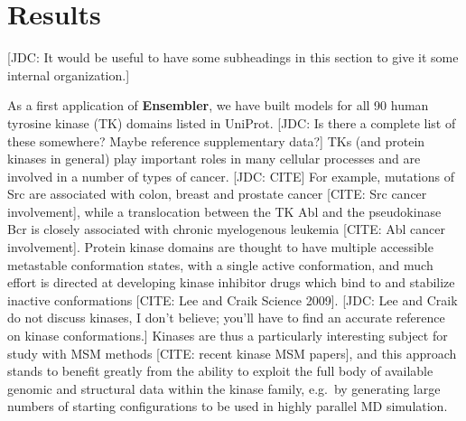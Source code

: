 \documentclass[aps,pre,twocolumn,nofootinbib,superscriptaddress,linenumbers]{revtex4-1}
\begin{document}







\label{section:design}

\section{Results}
\label{section:results}

{\color{red}[JDC: It would be useful to have some subheadings in this section to give it some internal organization.]}

As a first application of {\bf Ensembler}, we have built models for all 90 human tyrosine kinase (TK) domains listed in UniProt.
{\color{red}[JDC: Is there a complete list of these somewhere?  Maybe reference supplementary data?]}
TKs (and protein kinases in general) play important roles in many cellular processes and are involved in a number of types of cancer.
{\color{red}[JDC: CITE]}
For example, mutations of Src are associated with colon, breast and prostate cancer {\color{red}[CITE: Src cancer involvement]}, while a translocation between the TK Abl and the pseudokinase Bcr is closely associated with chronic myelogenous leukemia {\color{red}[CITE: Abl cancer involvement]}.
Protein kinase domains are thought to have multiple accessible metastable conformation states, with a single active conformation, and much effort is directed at developing kinase inhibitor drugs which bind to and stabilize inactive conformations [CITE: Lee and Craik Science 2009].
{\color{red}[JDC: Lee and Craik do not discuss kinases, I don't believe; you'll have to find an accurate reference on kinase conformations.]}
Kinases are thus a particularly interesting subject for study with MSM methods [CITE: recent kinase MSM papers], and this approach stands to benefit greatly from the ability to exploit the full body of available genomic and structural data within the kinase family, e.g.~by generating large numbers of starting configurations to be used in highly parallel MD simulation.
\end{document}
